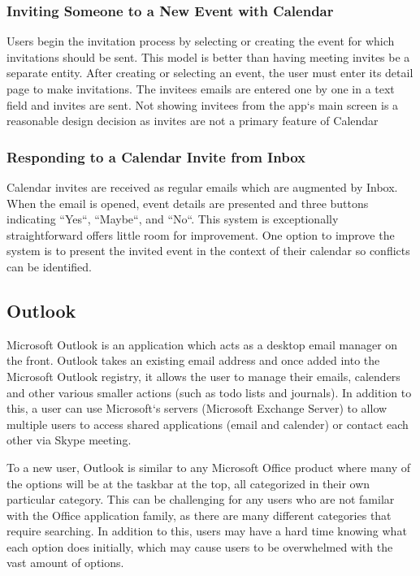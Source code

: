\documentclass{sigchi}
\begin{document}
\subsubsection{Inviting Someone to a New Event with Calendar}
Users begin the invitation process by selecting or creating the event for which invitations should be sent.
This model is better than having meeting invites be a separate entity.
After creating or selecting an event, the user must enter its detail page to make invitations.
The invitees emails are entered one by one in a text field and invites are sent.
Not showing invitees from the app`s main screen is a reasonable design decision as invites are not a primary feature of Calendar

\subsubsection{Responding to a Calendar Invite from Inbox}
Calendar invites are received as regular emails which are augmented by Inbox.
When the email is opened, event details are presented and three buttons indicating ``Yes``, ``Maybe``, and ``No``.
This system is exceptionally straightforward offers little room for improvement.
One option to improve the system is to present the invited event in the context of their calendar so conflicts can be identified.
\FloatBarrier
\subsection{Outlook}
\FloatBarrier
Microsoft Outlook is an application which acts as a desktop email manager on the front. 
Outlook takes an existing email address and once added into the Microsoft Outlook registry, it allows the user to manage their emails, calenders and other various smaller actions (such as todo lists and journals). 
In addition to this, a user can use Microsoft`s servers (Microsoft Exchange Server) to allow multiple users to access shared applications (email and calender) or contact each other via Skype meeting.

To a new user, Outlook is similar to any Microsoft Office product where many of the options will be at the taskbar at the top, all categorized in their own particular category. 
This can be challenging for any users who are not familar with the Office application family, as there are many different categories that require searching. 
In addition to this, users may have a hard time knowing what each option does initially, which may cause users to be overwhelmed with the vast amount of options. 
\end{document}
